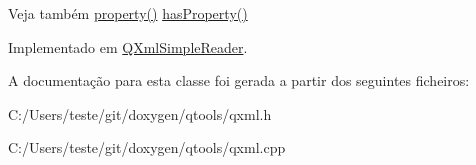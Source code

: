 \begin{DoxySeeAlso}{Veja também}
\hyperlink{class_q_xml_reader_a35b6ac10f0e2681f8b23f518f63d2ce0}{property()} \hyperlink{class_q_xml_reader_a35cf35e0b6114f1575ad0659404f3f00}{has\-Property()} 
\end{DoxySeeAlso}


Implementado em \hyperlink{class_q_xml_simple_reader_aeed13d669b6ac55e522ab26a1f1c620a}{Q\-Xml\-Simple\-Reader}.



A documentação para esta classe foi gerada a partir dos seguintes ficheiros\-:\begin{DoxyCompactItemize}
\item 
C\-:/\-Users/teste/git/doxygen/qtools/qxml.\-h\item 
C\-:/\-Users/teste/git/doxygen/qtools/qxml.\-cpp\end{DoxyCompactItemize}
